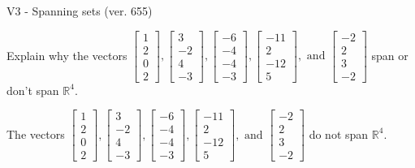 \begin{exercise}
  \begin{exerciseTitle}V3 - Spanning sets (ver. 655)\end{exerciseTitle}
  \begin{exerciseStatement}
    Explain why the vectors \(\left[\begin{array}{r}
1 \\
2 \\
0 \\
2
\end{array}\right] , \left[\begin{array}{r}
3 \\
-2 \\
4 \\
-3
\end{array}\right] , \left[\begin{array}{r}
-6 \\
-4 \\
-4 \\
-3
\end{array}\right] , \left[\begin{array}{r}
-11 \\
2 \\
-12 \\
5
\end{array}\right] , \text{ and } \left[\begin{array}{r}
-2 \\
2 \\
3 \\
-2
\end{array}\right]\) span or don't span \(\mathbb{R}^4\). 
	


  \end{exerciseStatement}
  \begin{exerciseAnswer}
   The vectors \(\left[\begin{array}{r}
1 \\
2 \\
0 \\
2
\end{array}\right] , \left[\begin{array}{r}
3 \\
-2 \\
4 \\
-3
\end{array}\right] , \left[\begin{array}{r}
-6 \\
-4 \\
-4 \\
-3
\end{array}\right] , \left[\begin{array}{r}
-11 \\
2 \\
-12 \\
5
\end{array}\right] , \text{ and } \left[\begin{array}{r}
-2 \\
2 \\
3 \\
-2
\end{array}\right]\) 
  	 do not  
	span \(\mathbb{R}^4\).
  



\end{exerciseAnswer}
\end{exercise}
